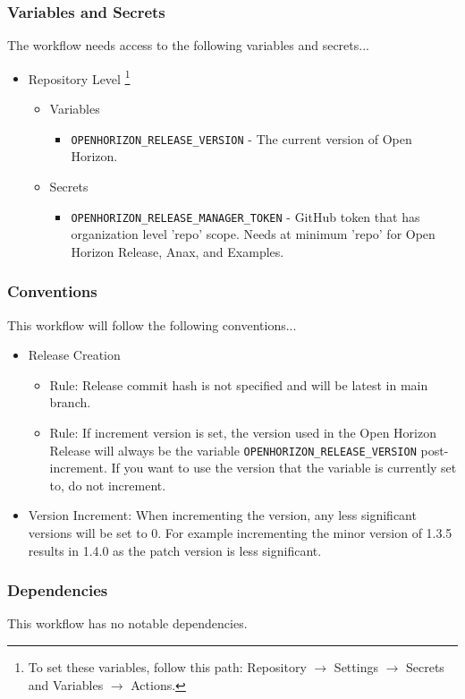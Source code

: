 \documentclass[a4paper,11pt]{article}
\begin{document}
\subsubsection{Variables and Secrets}
The workflow needs access to the following variables and secrets...
\begin{itemize}
    \item Repository Level \footnote{To set these variables, follow this path: Repository $\rightarrow$ Settings $\rightarrow$ Secrets and Variables $\rightarrow$ Actions.}
    \begin{itemize}
        \item Variables
        \begin{itemize}
            \item\verb|OPENHORIZON_RELEASE_VERSION| - The current version of Open Horizon.
        \end{itemize}
        \item Secrets
        \begin{itemize}
            \item\verb|OPENHORIZON_RELEASE_MANAGER_TOKEN| - GitHub token that has organization level 'repo' scope. Needs at minimum 'repo' for Open Horizon Release, Anax, and Examples.
        \end{itemize}
    \end{itemize}
\end{itemize}


\subsubsection{Conventions}
This workflow will follow the following conventions...
\begin{itemize}
    \item Release Creation
    \begin{itemize}
        \item Rule: Release commit hash is not specified and will be latest in main branch.
        \item Rule: If increment version is set, the version used in the Open Horizon Release will always be the variable \verb|OPENHORIZON_RELEASE_VERSION| post-increment. If you want to use the version that the variable is currently set to, do not increment.
    \end{itemize}
    \item Version Increment: When incrementing the version, any less significant versions will be set to 0. For example incrementing the minor version of 1.3.5 results in 1.4.0 as the patch version is less significant.
\end{itemize}

\subsubsection{Dependencies}
This workflow has no notable dependencies.
\end{document}
